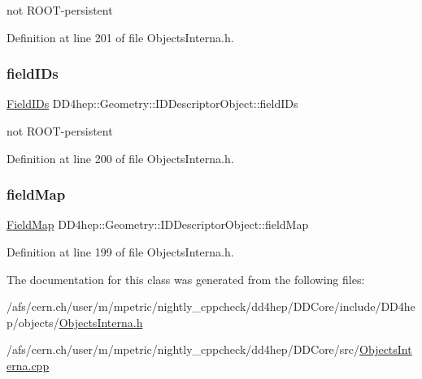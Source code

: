 not R\+O\+O\+T-\/persistent 



Definition at line 201 of file Objects\+Interna.\+h.

\hypertarget{class_d_d4hep_1_1_geometry_1_1_i_d_descriptor_object_a5f76652b444d990c08435cf7fdc0e4ea}{}\label{class_d_d4hep_1_1_geometry_1_1_i_d_descriptor_object_a5f76652b444d990c08435cf7fdc0e4ea} 
\subsubsection{\texorpdfstring{field\+I\+Ds}{fieldIDs}}
{\footnotesize\ttfamily \hyperlink{class_d_d4hep_1_1_geometry_1_1_i_d_descriptor_object_aa9d779170fd1d2221d27f3b63df6d6d4}{Field\+I\+Ds} D\+D4hep\+::\+Geometry\+::\+I\+D\+Descriptor\+Object\+::field\+I\+Ds}



not R\+O\+O\+T-\/persistent 



Definition at line 200 of file Objects\+Interna.\+h.

\hypertarget{class_d_d4hep_1_1_geometry_1_1_i_d_descriptor_object_a56d35066c16243ed986ee35c789b5a2a}{}\label{class_d_d4hep_1_1_geometry_1_1_i_d_descriptor_object_a56d35066c16243ed986ee35c789b5a2a} 
\subsubsection{\texorpdfstring{field\+Map}{fieldMap}}
{\footnotesize\ttfamily \hyperlink{class_d_d4hep_1_1_geometry_1_1_i_d_descriptor_object_a784af03aa08575a914c2399b45eae052}{Field\+Map} D\+D4hep\+::\+Geometry\+::\+I\+D\+Descriptor\+Object\+::field\+Map}



Definition at line 199 of file Objects\+Interna.\+h.



The documentation for this class was generated from the following files\+:\begin{DoxyCompactItemize}
\item 
/afs/cern.\+ch/user/m/mpetric/nightly\+\_\+cppcheck/dd4hep/\+D\+D\+Core/include/\+D\+D4hep/objects/\hyperlink{_objects_interna_8h}{Objects\+Interna.\+h}\item 
/afs/cern.\+ch/user/m/mpetric/nightly\+\_\+cppcheck/dd4hep/\+D\+D\+Core/src/\hyperlink{_objects_interna_8cpp}{Objects\+Interna.\+cpp}\end{DoxyCompactItemize}

